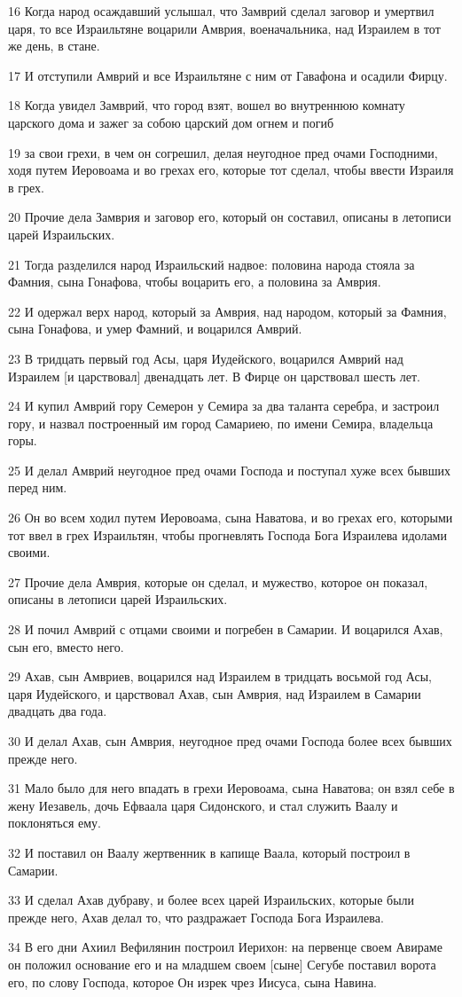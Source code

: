 \par 16 Когда народ осаждавший услышал, что Замврий сделал заговор и умертвил царя, то все Израильтяне воцарили Амврия, военачальника, над Израилем в тот же день, в стане.
\par 17 И отступили Амврий и все Израильтяне с ним от Гавафона и осадили Фирцу.
\par 18 Когда увидел Замврий, что город взят, вошел во внутреннюю комнату царского дома и зажег за собою царский дом огнем и погиб
\par 19 за свои грехи, в чем он согрешил, делая неугодное пред очами Господними, ходя путем Иеровоама и во грехах его, которые тот сделал, чтобы ввести Израиля в грех.
\par 20 Прочие дела Замврия и заговор его, который он составил, описаны в летописи царей Израильских.
\par 21 Тогда разделился народ Израильский надвое: половина народа стояла за Фамния, сына Гонафова, чтобы воцарить его, а половина за Амврия.
\par 22 И одержал верх народ, который за Амврия, над народом, который за Фамния, сына Гонафова, и умер Фамний, и воцарился Амврий.
\par 23 В тридцать первый год Асы, царя Иудейского, воцарился Амврий над Израилем [и царствовал] двенадцать лет. В Фирце он царствовал шесть лет.
\par 24 И купил Амврий гору Семерон у Семира за два таланта серебра, и застроил гору, и назвал построенный им город Самариею, по имени Семира, владельца горы.
\par 25 И делал Амврий неугодное пред очами Господа и поступал хуже всех бывших перед ним.
\par 26 Он во всем ходил путем Иеровоама, сына Наватова, и во грехах его, которыми тот ввел в грех Израильтян, чтобы прогневлять Господа Бога Израилева идолами своими.
\par 27 Прочие дела Амврия, которые он сделал, и мужество, которое он показал, описаны в летописи царей Израильских.
\par 28 И почил Амврий с отцами своими и погребен в Самарии. И воцарился Ахав, сын его, вместо него.
\par 29 Ахав, сын Амвриев, воцарился над Израилем в тридцать восьмой год Асы, царя Иудейского, и царствовал Ахав, сын Амврия, над Израилем в Самарии двадцать два года.
\par 30 И делал Ахав, сын Амврия, неугодное пред очами Господа более всех бывших прежде него.
\par 31 Мало было для него впадать в грехи Иеровоама, сына Наватова; он взял себе в жену Иезавель, дочь Ефваала царя Сидонского, и стал служить Ваалу и поклоняться ему.
\par 32 И поставил он Ваалу жертвенник в капище Ваала, который построил в Самарии.
\par 33 И сделал Ахав дубраву, и более всех царей Израильских, которые были прежде него, Ахав делал то, что раздражает Господа Бога Израилева.
\par 34 В его дни Ахиил Вефилянин построил Иерихон: на первенце своем Авираме он положил основание его и на младшем своем [сыне] Сегубе поставил ворота его, по слову Господа, которое Он изрек чрез Иисуса, сына Навина.

